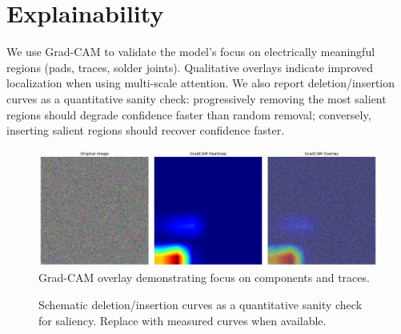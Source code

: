 \documentclass[conference]{IEEEtran}
\begin{document}
\section{Explainability}
We use Grad-CAM \cite{gradcam} to validate the model's focus on electrically meaningful regions (pads, traces, solder joints). Qualitative overlays indicate improved localization when using multi-scale attention. We also report deletion/insertion curves as a quantitative sanity check: progressively removing the most salient regions should degrade confidence faster than random removal; conversely, inserting salient regions should recover confidence faster.
\begin{figure}[t]
    \centering
\includegraphics[width=0.85\linewidth]{outputs/explainability/gradcam_analysis.png}
    \caption{Grad-CAM overlay demonstrating focus on components and traces.}
    \label{fig:gradcam}
\end{figure}

\begin{figure}[!t]
  \centering
  \caption{Schematic deletion/insertion curves as a quantitative sanity check for saliency. Replace with measured curves when available.}
  \label{fig:del_ins}
\end{figure}
\end{document}
